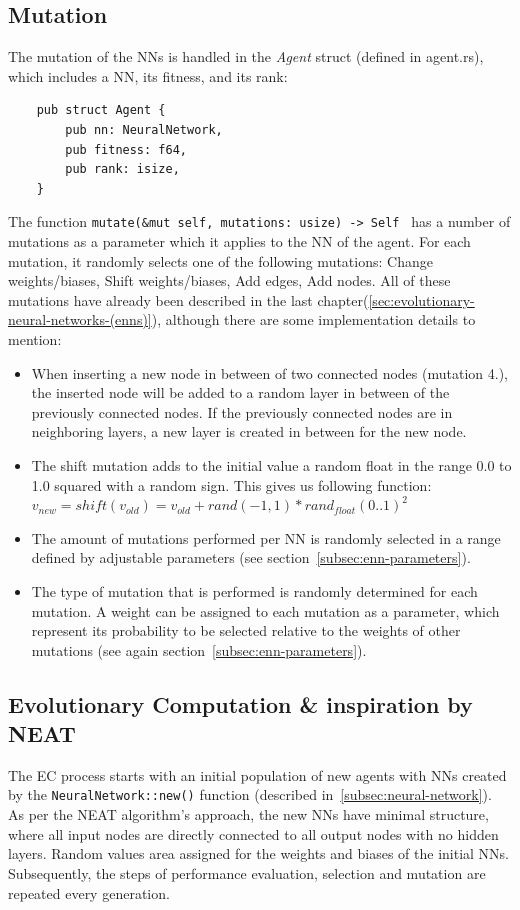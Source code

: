 \documentclass[11pt]{report}
\begin{document}
\begin{enumerate}
    \subsection{Mutation}\label{subsec:mutation}
    The mutation of the NNs is handled in the \textit{Agent} struct (defined in agent.rs), which includes a NN, its fitness, and its rank:
    \begin{verbatim}
    pub struct Agent {
        pub nn: NeuralNetwork,
        pub fitness: f64,
        pub rank: isize,
    }
    \end{verbatim}
    The function \texttt{mutate(&mut self, mutations: usize) -> Self {} } has a number of mutations as a parameter which it applies to the NN of the agent.
    For each mutation, it randomly selects one of the following mutations: Change weights/biases, Shift weights/biases, Add edges, Add nodes.
    All of these mutations have already been described in the last chapter(\ref{sec:evolutionary-neural-networks-(enns)}), although there are some implementation details to mention:
    \begin{itemize}
        \item When inserting a new node in between of two connected nodes (mutation 4.), the inserted node will be added to a random layer in between of the previously connected nodes.
        If the previously connected nodes are in neighboring layers, a new layer is created in between for the new node.
        \item The shift mutation adds to the initial value a random float in the range 0.0 to 1.0 squared with a random sign.
        This gives us following function: \\
        $v_{new} = shift(v_{old}) = v_{old} + rand(-1, 1) * rand_{float}(0..1)^2$
        \item The amount of mutations performed per NN is randomly selected in a range defined by adjustable parameters (see section~\ref{subsec:enn-parameters}).
        \item The type of mutation that is performed is randomly determined for each mutation.
        A weight can be assigned to each mutation as a parameter, which represent its probability to be selected relative to the weights of other mutations (see again section~\ref{subsec:enn-parameters}).
    \end{itemize}

    \subsection{Evolutionary Computation \& inspiration by NEAT}\label{subsec:evolutionary-computation-&-inspiration-by-neat}
    The EC process starts with an initial population of new agents with NNs created by the \texttt{NeuralNetwork::new()} function (described in~\ref{subsec:neural-network}).
    As per the NEAT algorithm's approach, the new NNs have minimal structure, where all input nodes are directly connected to all output nodes with no hidden layers.
    Random values area assigned for the weights and biases of the initial NNs.
    Subsequently, the steps of performance evaluation, selection and mutation are repeated every generation.


\end{enumerate}
\end{document}
